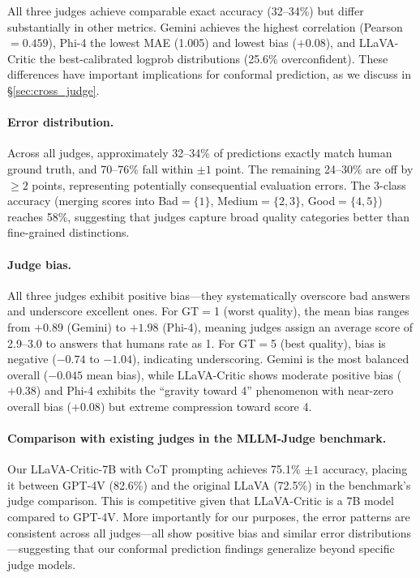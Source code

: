 \documentclass{article}
\begin{document}
All three judges achieve comparable exact accuracy (32--34\%) but differ substantially in other metrics. Gemini achieves the highest correlation (Pearson $= 0.459$), Phi-4 the lowest MAE (1.005) and lowest bias ($+0.08$), and LLaVA-Critic the best-calibrated logprob distributions (25.6\% overconfident). These differences have important implications for conformal prediction, as we discuss in \S\ref{sec:cross_judge}.

\paragraph{Error distribution.} Across all judges, approximately 32--34\% of predictions exactly match human ground truth, and 70--76\% fall within $\pm 1$ point. The remaining 24--30\% are off by $\geq 2$ points, representing potentially consequential evaluation errors. The 3-class accuracy (merging scores into Bad$=\{1\}$, Medium$=\{2,3\}$, Good$=\{4,5\}$) reaches 58\%, suggesting that judges capture broad quality categories better than fine-grained distinctions.

\paragraph{Judge bias.} All three judges exhibit positive bias---they systematically overscore bad answers and underscore excellent ones. For GT$=$1 (worst quality), the mean bias ranges from $+0.89$ (Gemini) to $+1.98$ (Phi-4), meaning judges assign an average score of 2.9--3.0 to answers that humans rate as 1. For GT$=$5 (best quality), bias is negative ($-0.74$ to $-1.04$), indicating underscoring. Gemini is the most balanced overall ($-0.045$ mean bias), while LLaVA-Critic shows moderate positive bias ($+0.38$) and Phi-4 exhibits the ``gravity toward 4'' phenomenon with near-zero overall bias ($+0.08$) but extreme compression toward score 4.

\paragraph{Comparison with existing judges in the MLLM-Judge benchmark.} Our LLaVA-Critic-7B with CoT prompting achieves 75.1\% $\pm 1$ accuracy, placing it between GPT-4V (82.6\%) and the original LLaVA (72.5\%) in the benchmark's judge comparison. This is competitive given that LLaVA-Critic is a 7B model compared to GPT-4V. More importantly for our purposes, the error patterns are consistent across all judges---all show positive bias and similar error distributions---suggesting that our conformal prediction findings generalize beyond specific judge models.
\end{document}
